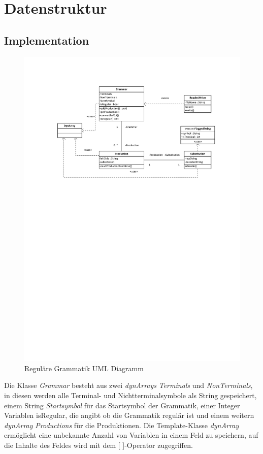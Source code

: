 \section{Datenstruktur}

\subsection{Implementation}

\begin{figure}[h]
  \begin{center}
  \includegraphics[scale=0.95]{objectsToInclude/UMLGrammar.pdf}
  \caption{Reguläre Grammatik UML Diagramm}
  \label{fig:UMLRegGrammar}
  \end{center}
\end{figure}

Die Klasse \textit{Grammar} besteht aus zwei \textit{dynArrays}
\textit{Terminals} und \textit{NonTerminals}, in diesen werden alle Terminal- und Nichtterminalsymbole
als String gespeichert, einem String \textit{Startsymbol} für das Startsymbol
der Grammatik, einer Integer Variablen isRegular, die angibt ob die Grammatik
regulär ist und einem weitern \textit{dynArray} \textit{Productions} für die
Produktionen. Die Template-Klasse \textit{dynArray} ermöglicht eine unbekannte
Anzahl von Variablen in einem Feld zu speichern, auf die Inhalte des Feldes
wird mit dem [ ]-Operator zugegriffen.


